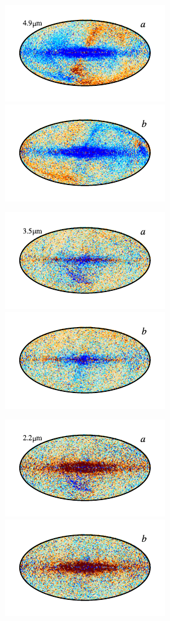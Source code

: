 \documentclass{aa}
\begin{document}
\begin{figure}
  \includegraphics{figs/res_maps/res_04a_c0001_000019.pdf}\includegraphics{figs/res_maps/res_04b_c0001_000019.pdf}
  \vspace*{-0.85cm}
  
  \includegraphics{figs/res_maps/res_03a_c0001_000019.pdf}\includegraphics{figs/res_maps/res_03b_c0001_000019.pdf}
  \vspace*{-0.85cm}  

	\includegraphics{figs/res_maps/res_02a_c0001_000019.pdf}\includegraphics{figs/res_maps/res_02b_c0001_000019.pdf}
  \vspace*{-0.85cm}


\end{figure}
\end{document}
